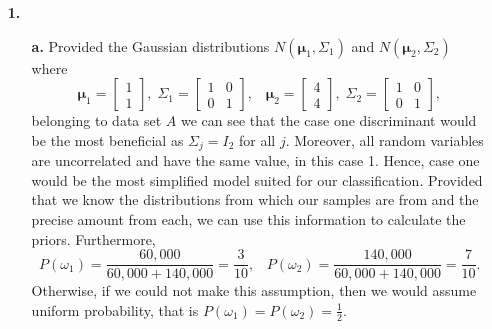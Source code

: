 \documentclass[ 12pt ]{article}
\begin{document}
\begin{enumerate}
    \item[\textbf{1.}]
        \begin{enumerate}
            \item[\textbf{a.}] Provided the Gaussian distributions $N(\mathbf{\mu}_1, \Sigma_1)$ and $N(\mathbf{\mu}_2, \Sigma_2)$ where $$\mathbf{\mu}_1 = \begin{bmatrix} 1 \\ 1
                \end{bmatrix},\; \Sigma_1 = \begin{bmatrix} 1 & 0 \\ 0 & 1 \end{bmatrix},\;\;\; \mathbf{\mu}_2 = \begin{bmatrix} 4 \\ 4 \end{bmatrix},\; \Sigma_2 = \begin{bmatrix} 1 & 0 \\
                0 & 1 \end{bmatrix},$$ belonging to data set $A$ we can see that the case one discriminant would be the most beneficial as $\Sigma_j = I_2$ for all $j$. Moreover, all
                random variables are uncorrelated and have the same value, in this case 1. Hence, case one would be the most simplified model suited for our classification. Provided that
                we know the distributions from which our samples are from and the precise amount from each, we can use this information to calculate the priors. Furthermore, $$P(\omega_1
                ) = \frac{60,000}{60,000 + 140,000} = \frac{3}{10},\;\;\; P(\omega_2) = \frac{140,000}{60,000 + 140,000} = \frac{7}{10}.$$ Otherwise, if we could not make this assumption,
                then we would assume uniform probability, that is $P(\omega_1) = P(\omega_2) = \frac{1}{2}$.


\end{enumerate}
\end{enumerate}
\end{document}

